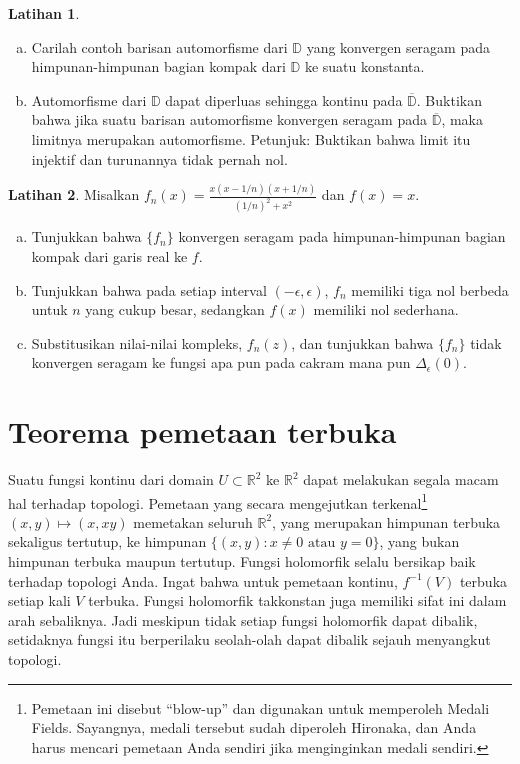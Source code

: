 \documentclass[12pt,openany]{book}
\newcommand{\R}{{\mathbb{R}}}
\newcommand{\D}{{\mathbb{D}}}
\newcommand{\myquote}[1]{``#1''}
\theoremstyle{plain}
\theoremstyle{remark}
\theoremstyle{definition}
\newenvironment{exbox}{%
    \def\FrameCommand{\vrule width 1pt \relax\hspace{10pt}}%
    \MakeFramed{\advance\hsize-\width\FrameRestore}%
}{%
    \endMakeFramed
}
\newenvironment{exparts}{%
    \leavevmode\begin{enumerate}[a),noitemsep,topsep=0pt,parsep=0pt,partopsep=0pt]
}{%
    \end{enumerate}
}
\theoremstyle{exercise}
\newtheorem{exercise}{Latihan}[section]
\theoremstyle{example}
\begin{document}
\begin{exbox}
\begin{exercise}
\begin{exparts}
\item
Carilah contoh barisan automorfisme dari $\D$ yang konvergen
seragam pada himpunan-himpunan bagian kompak dari $\D$ ke suatu konstanta.
\item
Automorfisme dari $\D$ dapat diperluas sehingga kontinu pada
$\overline{\D}$.  Buktikan bahwa jika suatu barisan
automorfisme konvergen seragam pada $\overline{\D}$, maka
limitnya merupakan automorfisme. Petunjuk: Buktikan bahwa limit itu injektif
dan turunannya tidak pernah nol.
\end{exparts}
\end{exercise}

\begin{exercise}
Misalkan $f_n(x) = \frac{x(x-1/n)(x+1/n)}{{(1/n)}^2+x^2}$ dan $f(x)=x$.
\begin{exparts}
\item
Tunjukkan bahwa $\{ f_n \}$ konvergen seragam pada himpunan-himpunan bagian kompak dari garis
real ke $f$.
\item
Tunjukkan bahwa pada setiap interval $(-\epsilon,\epsilon)$, $f_n$ memiliki tiga nol berbeda
untuk $n$ yang cukup besar, sedangkan $f(x)$ memiliki nol sederhana.
\item
Substitusikan nilai-nilai kompleks, $f_n(z)$, dan tunjukkan bahwa $\{ f_n \}$ tidak
konvergen seragam ke fungsi apa pun pada cakram mana pun $\Delta_{\epsilon}(0)$.
\end{exparts}
\end{exercise}
\end{exbox}

\section{Teorema pemetaan terbuka}

Suatu fungsi kontinu dari domain $U \subset \R^2$ ke $\R^2$ dapat melakukan segala
macam hal terhadap topologi.  Pemetaan yang secara mengejutkan terkenal\footnote{%
Pemetaan ini disebut \myquote{blow-up} dan digunakan untuk memperoleh Medali Fields.
Sayangnya, medali tersebut sudah diperoleh Hironaka, dan Anda
harus mencari pemetaan Anda sendiri jika menginginkan medali sendiri.}
$(x,y) \mapsto (x,xy)$
memetakan seluruh $\R^2$, yang merupakan himpunan terbuka sekaligus tertutup, ke
himpunan $\bigl\{ (x,y) : x \neq 0 \text{ atau } y=0 \bigr\}$, yang bukan himpunan terbuka maupun
tertutup.
Fungsi holomorfik selalu bersikap baik terhadap topologi Anda.
Ingat bahwa untuk pemetaan kontinu, $f^{-1}(V)$ terbuka setiap kali
$V$ terbuka.  Fungsi holomorfik takkonstan juga memiliki sifat ini dalam
arah sebaliknya.  Jadi meskipun tidak setiap fungsi holomorfik dapat dibalik, setidaknya fungsi itu
berperilaku seolah-olah dapat dibalik sejauh menyangkut topologi.
\end{document}
